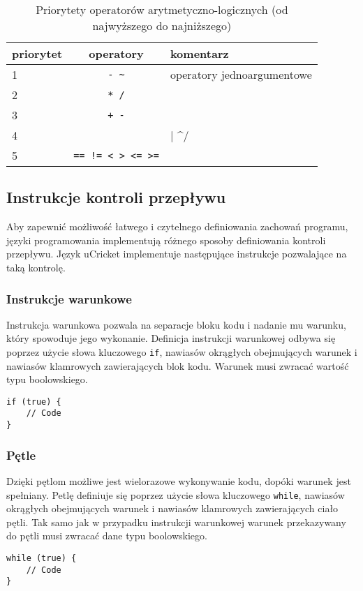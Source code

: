 \begin{table}
\centering
\caption{Priorytety operatorów arytmetyczno-logicznych (od najwyższego do najniższego)}
\begin{tabular}{lcl}
\toprule
priorytet & operatory & komentarz \\ \midrule
1 & \lstinline|- ~| & operatory jednoargumentowe \\
2 & \lstinline|* /| & \\
3 & \lstinline|+ -| & \\
4 & \lstinline/& | ^/ & \\
5 & \lstinline|== != < > <= >=| & \\ \bottomrule
\end{tabular}
\label{tbl:priorytety-operatorow}
\end{table}

\subsection{Instrukcje kontroli przepływu}
Aby zapewnić możliwość łatwego i czytelnego definiowania zachowań programu, języki programowania implementują różnego sposoby definiowania kontroli przepływu. Język uCricket implementuje następujące instrukcje pozwalające na taką kontrolę.

\subsubsection{Instrukcje warunkowe}
Instrukcja warunkowa pozwala na separacje bloku kodu i nadanie mu warunku, który spowoduje jego wykonanie. Definicja instrukcji warunkowej odbywa się poprzez użycie słowa kluczowego \lstinline|if|, nawiasów okrągłych obejmujących warunek i nawiasów klamrowych zawierających blok kodu. Warunek musi zwracać wartość typu boolowskiego.
\begin{lstlisting}
if (true) {
	// Code
}
\end{lstlisting}

\subsubsection{Pętle}
Dzięki pętlom możliwe jest wielorazowe wykonywanie kodu, dopóki warunek jest spełniany. Petlę definiuje się poprzez użycie słowa kluczowego \lstinline|while|, nawiasów okrągłych obejmujących warunek i nawiasów klamrowych zawierających ciało pętli. Tak samo jak w przypadku instrukcji warunkowej  warunek przekazywany do pętli musi zwracać dane typu boolowskiego.
\begin{lstlisting}
while (true) {
	// Code
}
\end{lstlisting}
 
